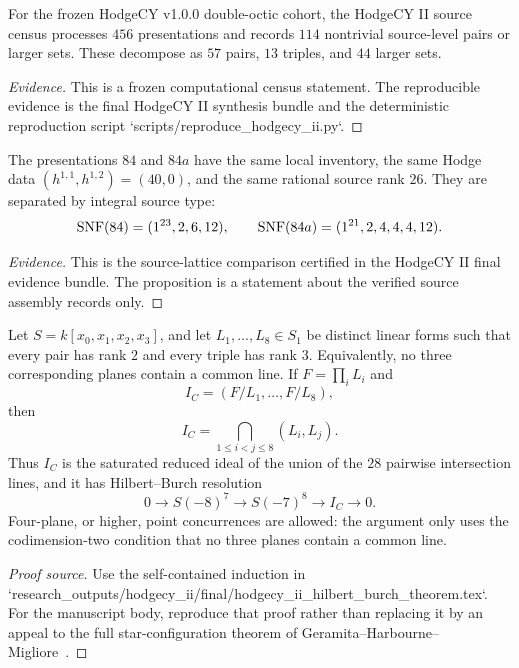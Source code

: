 \begin{theorem}\label{thm:source-fidelity-census}
For the frozen HodgeCY v1.0.0 double-octic cohort, the HodgeCY II source
census processes \(456\) presentations and records \(114\) nontrivial
source-level pairs or larger sets.  These decompose as \(57\) pairs,
\(13\) triples, and \(44\) larger sets.
\end{theorem}

\begin{proof}[Evidence]
This is a frozen computational census statement.  The reproducible evidence is
the final HodgeCY II synthesis bundle and the deterministic reproduction script
`scripts/reproduce_hodgecy_ii.py`.
\end{proof}

\begin{proposition}\label{prop:source-witness-84-84a}
The presentations \(84\) and \(84a\) have the same local inventory, the same
Hodge data \((h^{1,1},h^{1,2})=(40,0)\), and the same rational source rank
\(26\).  They are separated by integral source type:
\[
  {\rm SNF}(84)=(1^{23},2,6,12),
  \qquad
  {\rm SNF}(84a)=(1^{21},2,4,4,4,12).
\]
\end{proposition}

\begin{proof}[Evidence]
This is the source-lattice comparison certified in the HodgeCY II final
evidence bundle.  The proposition is a statement about the verified source
assembly records only.
\end{proof}

\begin{theorem}\label{thm:line-skeleton}
Let \(S=k[x_0,x_1,x_2,x_3]\), and let
\(L_1,\ldots,L_8\in S_1\) be distinct linear forms such that every pair has
rank \(2\) and every triple has rank \(3\).  Equivalently, no three
corresponding planes contain a common line.  If \(F=\prod_i L_i\) and
\[
  I_C=(F/L_1,\ldots,F/L_8),
\]
then
\[
  I_C=\bigcap_{1\le i<j\le 8}(L_i,L_j).
\]
Thus \(I_C\) is the saturated reduced ideal of the union of the \(28\)
pairwise intersection lines, and it has Hilbert--Burch resolution
\[
0\longrightarrow S(-8)^7\longrightarrow S(-7)^8
\longrightarrow I_C\longrightarrow 0 .
\]
Four-plane, or higher, point concurrences are allowed: the argument only uses
the codimension-two condition that no three planes contain a common line.
\end{theorem}

\begin{proof}[Proof source]
Use the self-contained induction in
`research_outputs/hodgecy_ii/final/hodgecy_ii_hilbert_burch_theorem.tex`.
For the manuscript body, reproduce that proof rather than replacing it by an
appeal to the full star-configuration theorem of
Geramita--Harbourne--Migliore~\cite{GeramitaHarbourneMigliore2013}.
\end{proof}

